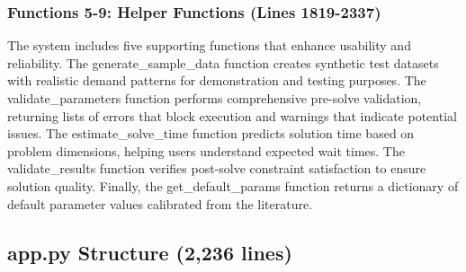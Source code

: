 \documentclass[11pt,letterpaper]{article}
\begin{document}
\subsubsection{Functions 5-9: Helper Functions (Lines 1819-2337)}
The system includes five supporting functions that enhance usability and reliability. The generate_sample_data function creates synthetic test datasets with realistic demand patterns for demonstration and testing purposes. The validate_parameters function performs comprehensive pre-solve validation, returning lists of errors that block execution and warnings that indicate potential issues. The estimate_solve_time function predicts solution time based on problem dimensions, helping users understand expected wait times. The validate_results function verifies post-solve constraint satisfaction to ensure solution quality. Finally, the get_default_params function returns a dictionary of default parameter values calibrated from the literature.

\subsection{app.py Structure (2,236 lines)}
\end{document}
